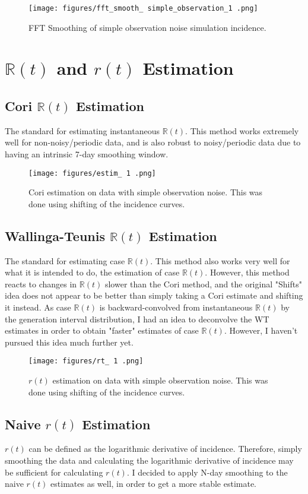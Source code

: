 \documentclass{article}
\newcommand{\nR}{\mathbb{R}}
\begin{document}
\clearpage
\begin{figure}[h!]
    \centering
    \texttt{[image: figures/fft\_smooth\_ simple\_observation\_1 .png]}
    \caption{FFT Smoothing of simple observation noise simulation incidence.}
\end{figure}

\section {$\nR(t)$ and $r(t)$ Estimation}
\subsection{Cori $\nR(t)$ Estimation}
The standard for estimating instantaneous $\nR(t)$. This method works extremely well for non-noisy/periodic data, and is also robust to noisy/periodic data due to having an intrinsic 7-day smoothing window. 

\clearpage
\begin{figure}[h!]
    \centering
    \texttt{[image: figures/estim\_ 1 .png]}
    \caption{Cori estimation on data with simple observation noise. This was done using shifting of the incidence curves.}
\end{figure}


\subsection{Wallinga-Teunis $\nR(t)$ Estimation}
The standard for estimating case $\nR(t)$. This method also works very well for what it is intended to do, the estimation of case $\nR(t)$. However, this method reacts to changes in $\nR(t)$ slower than the Cori method, and the original "Shifts" idea does not appear to be better than simply taking a Cori estimate and shifting it instead. As case $\nR(t)$  is backward-convolved from instantaneous $\nR(t)$ by the generation interval distribution, I had an idea to deconvolve the WT estimates in order to obtain "faster" estimates of case $\nR(t)$. However, I haven't pursued this idea much further yet.

\clearpage
\begin{figure}[h!]
    \centering
    \texttt{[image: figures/rt\_ 1 .png]}
    \caption{$r(t)$ estimation on data with simple observation noise. This was done using shifting of the incidence curves.}
\end{figure}


\subsection{Naive $r(t)$ Estimation}
$r(t)$ can be defined as the logarithmic derivative of incidence. Therefore, simply smoothing the data and calculating the logarithmic derivative of incidence may be sufficient for calculating $r(t)$. I decided to apply N-day smoothing to the naive $r(t)$ estimates as well, in order to get a more stable estimate.
\end{document}

